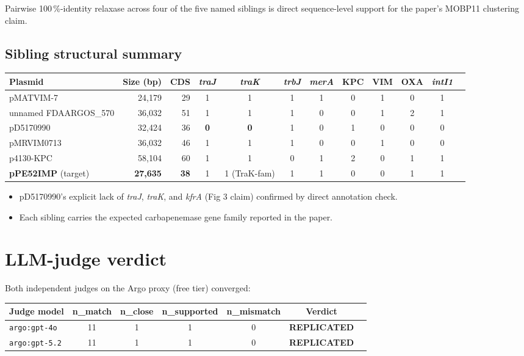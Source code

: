 \documentclass[11pt]{article}
\begin{document}
Pairwise 100\,\%-identity relaxase across four of the five named siblings is direct
sequence-level support for the paper's MOBP11 clustering claim.

\subsection{Sibling structural summary}
\begin{center}
\small
\begin{tabular}{lrrccccccccc}
\toprule
Plasmid & Size (bp) & CDS & \textit{traJ} & \textit{traK} & \textit{trbJ} & \textit{merA} & KPC & VIM & OXA & \textit{intI1} \\
\midrule
pMATVIM-7                  & 24{,}179 & 29 & 1 & 1 & 1 & 1 & 0 & 1 & 0 & 1 \\
unnamed FDAARGOS\_570      & 36{,}032 & 51 & 1 & 1 & 1 & 0 & 0 & 1 & 2 & 1 \\
pD5170990                  & 32{,}424 & 36 & \textbf{0} & \textbf{0} & 1 & 0 & 1 & 0 & 0 & 0 \\
pMRVIM0713                 & 36{,}032 & 46 & 1 & 1 & 1 & 0 & 0 & 1 & 0 & 0 \\
p4130-KPC                  & 58{,}104 & 60 & 1 & 1 & 0 & 1 & 2 & 0 & 1 & 1 \\
\textbf{pPE52IMP} (target) & \textbf{27{,}635} & \textbf{38} & 1 & 1 (TraK-fam) & 1 & 1 & 0 & 0 & 1 & 1 \\
\bottomrule
\end{tabular}
\end{center}

\begin{itemize}[leftmargin=1.2em]
  \item pD5170990's explicit lack of \textit{traJ}, \textit{traK}, and \textit{kfrA}
        (Fig 3 claim) confirmed by direct annotation check.
  \item Each sibling carries the expected carbapenemase gene family reported in the paper.
\end{itemize}

\section{LLM-judge verdict}
Both independent judges on the Argo proxy (free tier) converged:
\begin{center}
\begin{tabular}{lcccccc}
\toprule
Judge model & n\_match & n\_close & n\_supported & n\_mismatch & Verdict \\
\midrule
\texttt{argo:gpt-4o}  & 11 & 1 & 1 & 0 & \textbf{REPLICATED} \\
\texttt{argo:gpt-5.2} & 11 & 1 & 1 & 0 & \textbf{REPLICATED} \\
\bottomrule
\end{tabular}
\end{center}
\end{document}
